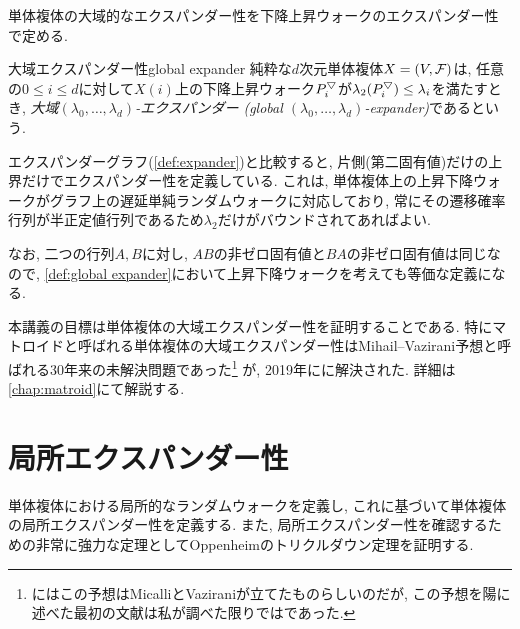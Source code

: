 単体複体の大域的なエクスパンダー性を下降上昇ウォークのエクスパンダー性で定める.
\begin{definition}{大域エクスパンダー性}{global expander}
    純粋な$d$次元単体複体$X=(V,\mathcal{F})$は,
    任意の$0\le i \le d$に対して$X(i)$上の下降上昇ウォーク$P^{\bigtriangledown}_i$が$\lambda_2(P^{\bigtriangledown}_i)\le \lambda_i$を満たすとき,
    \emph{大域$(\lambda_0,\dots,\lambda_{d})$-エクスパンダー (global $(\lambda_0,\dots,\lambda_{d})$-expander)}であるという.
\end{definition}
エクスパンダーグラフ(\cref{def:expander})と比較すると, 片側(第二固有値)だけの上界だけでエクスパンダー性を定義している.
これは, 単体複体上の上昇下降ウォークがグラフ上の遅延単純ランダムウォークに対応しており, 常にその遷移確率行列が半正定値行列であるため$\lambda_2$だけがバウンドされてあればよい.

なお, 二つの行列$A,B$に対し, $AB$の非ゼロ固有値と$BA$の非ゼロ固有値は同じなので, \cref{def:global expander}において上昇下降ウォークを考えても等価な定義になる.

本講義の目標は単体複体の大域エクスパンダー性を証明することである.
特にマトロイドと呼ばれる単体複体の大域エクスパンダー性はMihail--Vazirani予想\cite{balanced_matroids}と呼ばれる30年来の未解決問題であった\footnote{\cite{balanced_matroids}にはこの予想はMicalliとVaziraniが立てたものらしいのだが, この予想を陽に述べた最初の文献は私が調べた限りでは\citet{balanced_matroids}であった.}
が, 2019年に\citet{ALOV24}に解決された.
詳細は\cref{chap:matroid}にて解説する.


\section{局所エクスパンダー性}
単体複体における局所的なランダムウォークを定義し, これに基づいて単体複体の局所エクスパンダー性を定義する.
また, 局所エクスパンダー性を確認するための非常に強力な定理としてOppenheimのトリクルダウン定理を証明する.

